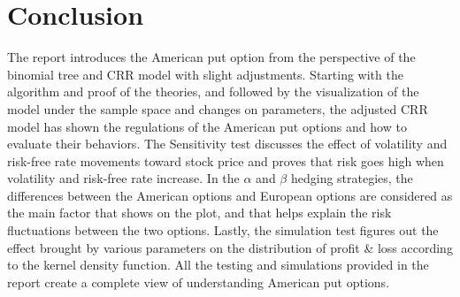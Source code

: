 \documentclass[12pt]{article}
\begin{document}
\section{Conclusion}
The report introduces the American put option from the perspective of the binomial tree and CRR model 
with slight adjustments. Starting with the algorithm and proof of the theories, and followed by the  
visualization of the model under the sample space and changes on parameters, the adjusted CRR model has shown 
the regulations of the American put options and how to evaluate their behaviors. The Sensitivity test discusses 
the effect of volatility and risk-free rate movements toward stock price and proves that risk goes high when 
volatility and risk-free rate increase. In the $\alpha$ and $\beta$ hedging strategies, the differences between the 
American options and European options are considered as the main factor that shows on the plot, and that helps 
explain the risk fluctuations between the two options. Lastly, the simulation test figures out the effect brought 
by various parameters on the distribution of profit \& loss according to the kernel density function. All the 
testing and simulations provided in the report create a complete view of understanding American put options.
\end{document}
